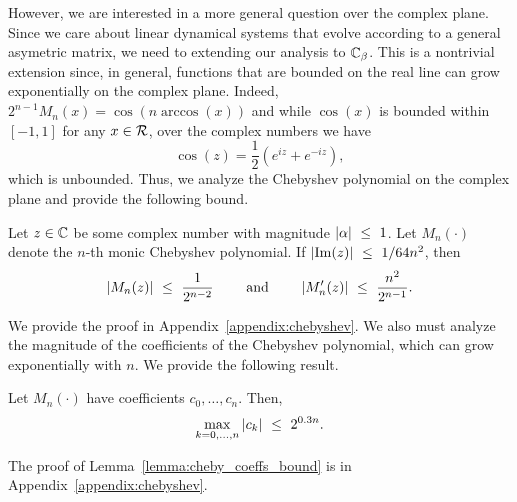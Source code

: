 However, we are interested in a more general question over the complex plane. Since we care about linear dynamical systems that evolve according to a general asymetric matrix,  we need to extending our analysis to $\mathbb{C}_{\beta}$. This is a nontrivial extension since, in general, functions that are bounded on the real line can grow exponentially on the complex plane. Indeed, $2^{n-1} M_n(x) = \cos ( n \arccos(x) )$ and while $\cos(x)$ is bounded within $[-1,1]$ for any $x \in {\mathcal R}$, over the complex numbers we have 
$$\cos(z) = \frac{1}{2}(e^{iz} + e^{-iz}) , $$ 
which is unbounded. Thus, we analyze the Chebyshev polynomial on the complex plane and provide the following bound.
\begin{lemma}
\label{lemma:cheby_bound}
    Let $z \in \mathbb{C}$ be some complex number with magnitude $|\alpha| ~\le~ 1$. Let $M_n(\cdot)$ denote the $n$-th monic Chebyshev polynomial. If $|\mathrm{Im}(z)| ~\le~ 1/64n^2$, then
    \begin{equation*}
        |M_n(z)| ~\le~ \frac{1}{2^{n-2}} \qquad \textrm{ and } \qquad 
        |M_n'(z)| ~\le~ \frac{n^2}{2^{n-1}}.
    \end{equation*}
\end{lemma}
We provide the proof in Appendix~\ref{appendix:chebyshev}. We also must analyze the magnitude of the coefficients of the Chebyshev polynomial, which can grow exponentially with $n$. We provide the following result. 
\begin{lemma}
\label{lemma:cheby_coeffs_bound}
    Let $M_n(\cdot)$ have coefficients $c_0, \dots, c_n$. Then,
    \begin{equation*}
        \max_{k = 0, \dots, n} |c_k| ~\le~ 2^{0.3n}.
    \end{equation*}
\end{lemma}
The proof of Lemma~\ref{lemma:cheby_coeffs_bound} is in Appendix~\ref{appendix:chebyshev}. 